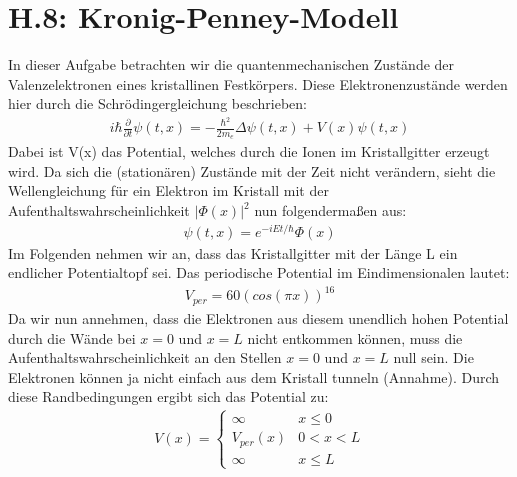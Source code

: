 \documentclass[ngerman]{scrartcl}
\begin{document}
\section{H.8: Kronig-Penney-Modell}
	In dieser Aufgabe betrachten wir die quantenmechanischen Zustände der Valenzelektronen eines kristallinen Festkörpers. Diese Elektronenzustände werden hier durch die Schrödingergleichung beschrieben:
	\begin{align}
		i\hbar \frac{\partial}{\partial t} \psi(t,x) = -\frac{\hbar^2}{2m_e} \Delta \psi(t,x) + V(x) \psi(t,x)
	\end{align}
	Dabei ist V(x) das Potential, welches durch die Ionen im Kristallgitter erzeugt wird. 
	Da sich die (stationären) Zustände mit der Zeit nicht verändern, sieht die Wellengleichung für ein Elektron im Kristall mit der Aufenthaltswahrscheinlichkeit ${|\Phi(x)|}^2$ nun folgendermaßen aus:
	\begin{align}
		\psi(t,x) = e^{-iEt/\hbar}\Phi(x)
	\end{align}
	Im Folgenden nehmen wir an, dass das Kristallgitter mit der Länge L ein endlicher Potentialtopf sei. Das periodische Potential im Eindimensionalen lautet:
	\begin{align}
		V_{per} = 60 (cos(\pi x))^{16}
	\end{align}
	Da wir nun annehmen, dass die Elektronen aus diesem unendlich hohen Potential durch die Wände bei $x = 0$ und $x = L$ nicht entkommen können, muss die Aufenthaltswahrscheinlichkeit an den Stellen $x = 0$ und $x = L$ null sein. Die Elektronen können ja nicht einfach aus dem Kristall tunneln (Annahme).
	Durch diese Randbedingungen ergibt sich das Potential zu:
	\begin{align}
		V(x)=\left\{\begin{array}{lll}
			\infty & x \leq 0\\
			V_{per}(x) & 0 < x < L\\
			\infty & x \leq L
		\end{array}\right. 
	\end{align}
\end{document}
